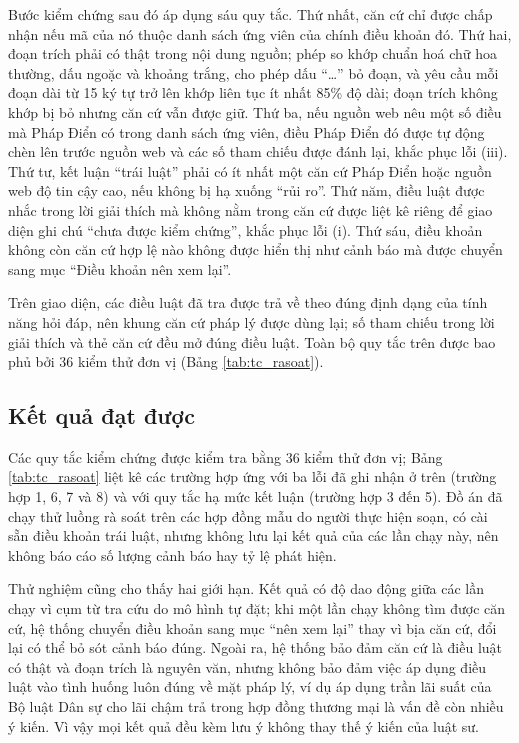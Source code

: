 \documentclass[../DoAn.tex]{subfiles}
\begin{document}
Bước kiểm chứng sau đó áp dụng sáu quy tắc. Thứ nhất, căn cứ chỉ được chấp nhận nếu mã của nó thuộc danh sách ứng viên của chính điều khoản đó. Thứ hai, đoạn trích phải có thật trong nội dung nguồn; phép so khớp chuẩn hoá chữ hoa thường, dấu ngoặc và khoảng trắng, cho phép dấu ``\ldots'' bỏ đoạn, và yêu cầu mỗi đoạn dài từ 15 ký tự trở lên khớp liên tục ít nhất 85\% độ dài; đoạn trích không khớp bị bỏ nhưng căn cứ vẫn được giữ. Thứ ba, nếu nguồn web nêu một số điều mà Pháp Điển có trong danh sách ứng viên, điều Pháp Điển đó được tự động chèn lên trước nguồn web và các số tham chiếu được đánh lại, khắc phục lỗi (iii). Thứ tư, kết luận ``trái luật'' phải có ít nhất một căn cứ Pháp Điển hoặc nguồn web độ tin cậy cao, nếu không bị hạ xuống ``rủi ro''. Thứ năm, điều luật được nhắc trong lời giải thích mà không nằm trong căn cứ được liệt kê riêng để giao diện ghi chú ``chưa được kiểm chứng'', khắc phục lỗi (i). Thứ sáu, điều khoản không còn căn cứ hợp lệ nào không được hiển thị như cảnh báo mà được chuyển sang mục ``Điều khoản nên xem lại''.

Trên giao diện, các điều luật đã tra được trả về theo đúng định dạng của tính năng hỏi đáp, nên khung căn cứ pháp lý được dùng lại; số tham chiếu trong lời giải thích và thẻ căn cứ đều mở đúng điều luật. Toàn bộ quy tắc trên được bao phủ bởi 36 kiểm thử đơn vị (Bảng \ref{tab:tc_rasoat}).

\subsection{Kết quả đạt được}
Các quy tắc kiểm chứng được kiểm tra bằng 36 kiểm thử đơn vị; Bảng \ref{tab:tc_rasoat} liệt kê các trường hợp ứng với ba lỗi đã ghi nhận ở trên (trường hợp 1, 6, 7 và 8) và với quy tắc hạ mức kết luận (trường hợp 3 đến 5). Đồ án đã chạy thử luồng rà soát trên các hợp đồng mẫu do người thực hiện soạn, có cài sẵn điều khoản trái luật, nhưng không lưu lại kết quả của các lần chạy này, nên không báo cáo số lượng cảnh báo hay tỷ lệ phát hiện.

Thử nghiệm cũng cho thấy hai giới hạn. Kết quả có độ dao động giữa các lần chạy vì cụm từ tra cứu do mô hình tự đặt; khi một lần chạy không tìm được căn cứ, hệ thống chuyển điều khoản sang mục ``nên xem lại'' thay vì bịa căn cứ, đổi lại có thể bỏ sót cảnh báo đúng. Ngoài ra, hệ thống bảo đảm căn cứ là điều luật có thật và đoạn trích là nguyên văn, nhưng không bảo đảm việc áp dụng điều luật vào tình huống luôn đúng về mặt pháp lý, ví dụ áp dụng trần lãi suất của Bộ luật Dân sự cho lãi chậm trả trong hợp đồng thương mại là vấn đề còn nhiều ý kiến. Vì vậy mọi kết quả đều kèm lưu ý không thay thế ý kiến của luật sư.
\end{document}
